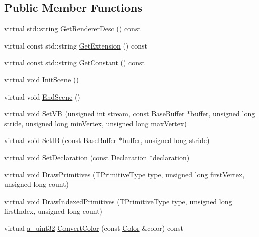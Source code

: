\subsection*{Public Member Functions}
\begin{DoxyCompactItemize}
\item 
virtual std\+::string \hyperlink{class_agmd_1_1_g_l_driver_a7f34ce6d173642e11ac9795fe7acc59d}{Get\+Renderer\+Desc} () const 
\item 
virtual const std\+::string \hyperlink{class_agmd_1_1_g_l_driver_a760ded3d771343d171cd43e308326398}{Get\+Extension} () const 
\item 
virtual const std\+::string \hyperlink{class_agmd_1_1_g_l_driver_abf2bff50bf8cc4428c6f26f077274796}{Get\+Constant} () const 
\item 
virtual void \hyperlink{class_agmd_1_1_g_l_driver_a4095bb84f37f1ed2dce478d4618ebb2f}{Init\+Scene} ()
\item 
virtual void \hyperlink{class_agmd_1_1_g_l_driver_ab6e2d7fcf613c056a2172eeaf48816b4}{End\+Scene} ()
\item 
virtual void \hyperlink{class_agmd_1_1_g_l_driver_a8a5b85d5128c13de54ffad58c3e54c7b}{Set\+V\+B} (unsigned int stream, const \hyperlink{class_agmd_1_1_base_buffer}{Base\+Buffer} $\ast$buffer, unsigned long stride, unsigned long min\+Vertex, unsigned long max\+Vertex)
\item 
virtual void \hyperlink{class_agmd_1_1_g_l_driver_abe6eae14930800c02a9ba02b9a50ba0f}{Set\+I\+B} (const \hyperlink{class_agmd_1_1_base_buffer}{Base\+Buffer} $\ast$buffer, unsigned long stride)
\item 
virtual void \hyperlink{class_agmd_1_1_g_l_driver_aae27a98b3d696f5ad82257ad55133895}{Set\+Declaration} (const \hyperlink{class_agmd_1_1_declaration}{Declaration} $\ast$declaration)
\item 
virtual void \hyperlink{class_agmd_1_1_g_l_driver_adae2a75d7f71fad8e717c0f8a7ad895d}{Draw\+Primitives} (\hyperlink{namespace_agmd_a0e38d0c34891ddd6eef72e1c9e55161c}{T\+Primitive\+Type} type, unsigned long first\+Vertex, unsigned long count)
\item 
virtual void \hyperlink{class_agmd_1_1_g_l_driver_a4f94f8cf789c88859eb4a678382d70ad}{Draw\+Indexed\+Primitives} (\hyperlink{namespace_agmd_a0e38d0c34891ddd6eef72e1c9e55161c}{T\+Primitive\+Type} type, unsigned long first\+Index, unsigned long count)
\item 
virtual \hyperlink{_common_defines_8h_a964296f9770051b9e4807b1f180dd416}{a\+\_\+uint32} \hyperlink{class_agmd_1_1_g_l_driver_a8831b91a267cb813eea70e53eb4958ea}{Convert\+Color} (const \hyperlink{class_agmd_utilities_1_1_color}{Color} \&color) const 

\end{DoxyCompactItemize}
